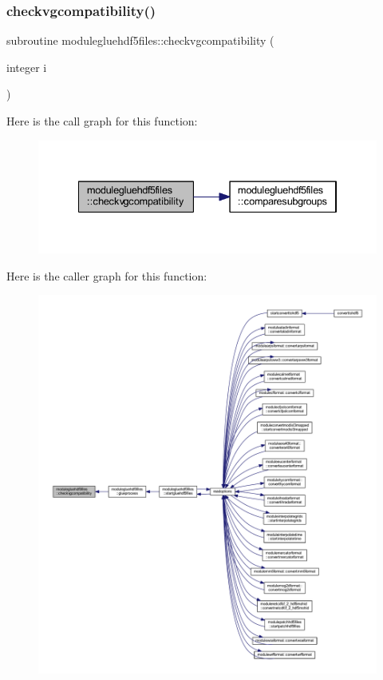 \subsubsection{\texorpdfstring{checkvgcompatibility()}{checkvgcompatibility()}}
{\footnotesize\ttfamily subroutine modulegluehdf5files\+::checkvgcompatibility (\begin{DoxyParamCaption}\item[{integer}]{i }\end{DoxyParamCaption})\hspace{0.3cm}{\ttfamily [private]}}

Here is the call graph for this function\+:\nopagebreak
\begin{figure}[H]
\begin{center}
\leavevmode
\includegraphics[width=334pt]{namespacemodulegluehdf5files_ada0309bfc59c3d5ea77eb5355fff2964_cgraph}
\end{center}
\end{figure}
Here is the caller graph for this function\+:\nopagebreak
\begin{figure}[H]
\begin{center}
\leavevmode
\includegraphics[width=350pt]{namespacemodulegluehdf5files_ada0309bfc59c3d5ea77eb5355fff2964_icgraph}
\end{center}
\end{figure}
\mbox{\label{namespacemodulegluehdf5files_affdb072b2fa667663ec2fcf107b11957}} 
